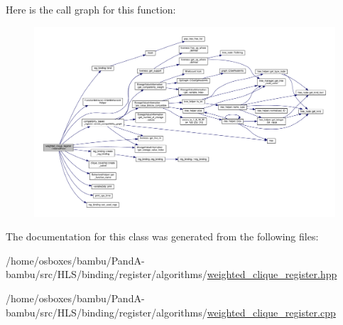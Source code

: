 Here is the call graph for this function\+:
\nopagebreak
\begin{figure}[H]
\begin{center}
\leavevmode
\includegraphics[width=350pt]{dd/dd9/classweighted__clique__register_a9c11748ba96df1f9d36792ec41f1f377_cgraph}
\end{center}
\end{figure}


The documentation for this class was generated from the following files\+:\begin{DoxyCompactItemize}
\item 
/home/osboxes/bambu/\+Pand\+A-\/bambu/src/\+H\+L\+S/binding/register/algorithms/\hyperlink{weighted__clique__register_8hpp}{weighted\+\_\+clique\+\_\+register.\+hpp}\item 
/home/osboxes/bambu/\+Pand\+A-\/bambu/src/\+H\+L\+S/binding/register/algorithms/\hyperlink{weighted__clique__register_8cpp}{weighted\+\_\+clique\+\_\+register.\+cpp}\end{DoxyCompactItemize}
